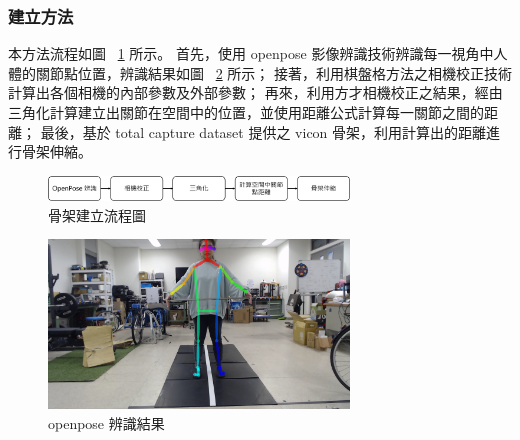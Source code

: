 \subsubsection{建立方法}
本方法流程如圖 ~\ref{ch3_fig_skeleton_flow} 所示。
首先，使用 openpose 影像辨識技術辨識每一視角中人體的關節點位置，辨識結果如圖 ~\ref{ch3_fig_openpose_result} 所示；
接著，利用棋盤格方法之相機校正技術計算出各個相機的內部參數及外部參數；
再來，利用方才相機校正之結果，經由三角化計算建立出關節在空間中的位置，並使用距離公式計算每一關節之間的距離；
最後，基於 total capture dataset 提供之 vicon 骨架，利用計算出的距離進行骨架伸縮。
\begin{figure}[!ht]
   \centering
   \includegraphics[width=8cm]{figure/ch3_fig_skeleton_flow.png}
    \caption[骨架建立流程圖]{骨架建立流程圖}
    \label{ch3_fig_skeleton_flow}
\end{figure}

\begin{figure}[!ht]
   \centering
   \includegraphics[width=8cm]{figure/ch3_fig_openpose_result.png}
    \caption[openpose 辨識結果]{openpose 辨識結果}
    \label{ch3_fig_openpose_result}
\end{figure}

